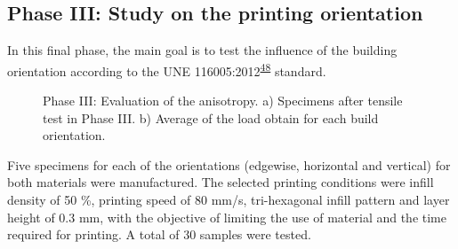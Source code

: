 \documentclass[
  12pt]{article}
\begin{document}
\newpage

\hypertarget{phase-iii-study-on-the-printing-orientation}{%
\subsection{Phase III: Study on the printing orientation}\label{phase-iii-study-on-the-printing-orientation}}

In this final phase, the main goal is to test the influence of the building orientation according to the UNE 116005:2012\textsuperscript{\protect\hyperlink{ref-Garcia-Dominguez2020}{48}} standard.

\begin{figure}[!h]

{\centering {}

}

\caption{Phase III: Evaluation of the anisotropy. a) Specimens after tensile test in  Phase III. b) Average of the load obtain for each build orientation.}\label{fig:phase3}
\end{figure}

Five specimens for each of the orientations (edgewise, horizontal and vertical) for both materials were manufactured.
The selected printing conditions were infill density of 50 \%, printing speed of 80 mm/s, tri-hexagonal infill pattern and layer height of 0.3 mm, with the objective of limiting the use of material and the time required for printing.
A total of 30 samples were tested.
\end{document}
